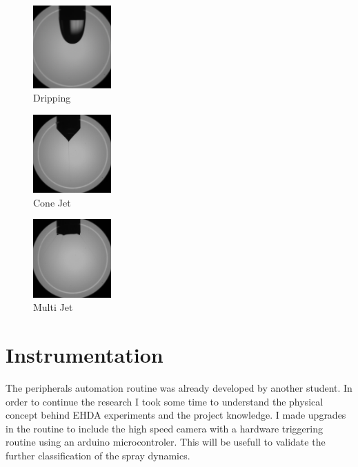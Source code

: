 \begin{multicols}{3}

  \begin{figure}[H]
      \center
      \includegraphics[width=3cm]{Figuras/drippingexample.png}
      \caption{Dripping}
  \end{figure}


  \begin{figure}[H]
      \center
      \includegraphics[width=3cm]{Figuras/conejetexample.png}
      \caption{Cone Jet}
  \end{figure}


  \begin{figure}[H]
      \center
      \includegraphics[width=3cm]{Figuras/multijetexample.png}
      \caption{Multi Jet}
  \end{figure}

\end{multicols}




\section{Instrumentation}
\label{sec:instrumentation}

The peripherals automation routine was already developed by another student. In order to continue the research I took some time to understand the physical concept behind EHDA experiments and the project knowledge.
I made upgrades in the routine to include the high speed camera with a hardware triggering routine using an arduino microcontroler. This will be usefull to validate the further classification of the spray dynamics.


